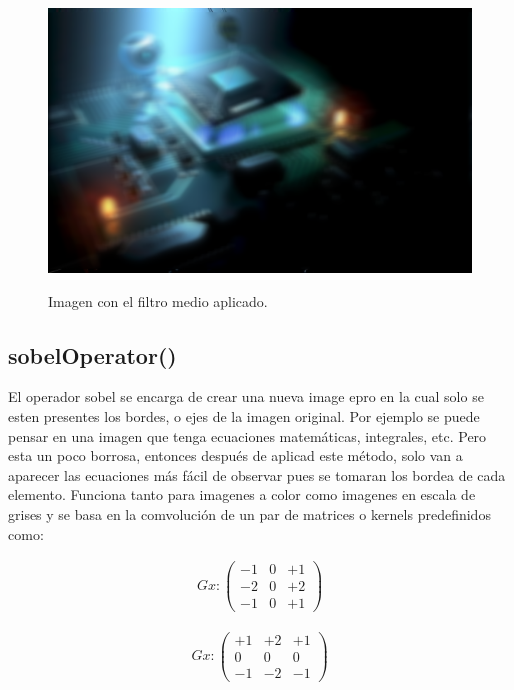 \documentclass{article}
\begin{document}
\begin{figure}[hbtp]
\caption{Imagen con el filtro medio aplicado.}
\centering
\includegraphics[scale=0.5]{imagenes/imagen_median_filter.png}
\label{fig:medianFilter}
\end{figure}


\subsection{sobelOperator()}
El operador sobel se encarga de crear una nueva image epro en la cual solo se esten presentes los bordes, o ejes de la imagen original. Por ejemplo se puede pensar en una imagen que tenga ecuaciones matem\' aticas, integrales, etc. Pero esta un poco borrosa, entonces despu\' es de aplicad este m\' etodo, solo van a aparecer las ecuaciones m\' as f\' acil de observar pues se tomaran los bordea de cada elemento. Funciona tanto para imagenes a color como imagenes en escala de grises y se basa en la comvoluci\' on de un par de matrices o kernels predefinidos como:

\begin{align}
Gx:
 \left( \begin{array}{ccc}
-1 & 0 & +1 \\
-2 & 0 & +2 \\
-1 & 0 & +1 \end{array} \right)
\end{align}

\begin{align}
Gx:
 \left( \begin{array}{ccc}
+1 & +2 & +1 \\
0 & 0 & 0 \\
-1 & -2 & -1 \end{array} \right)
\end{align}
\end{document}
